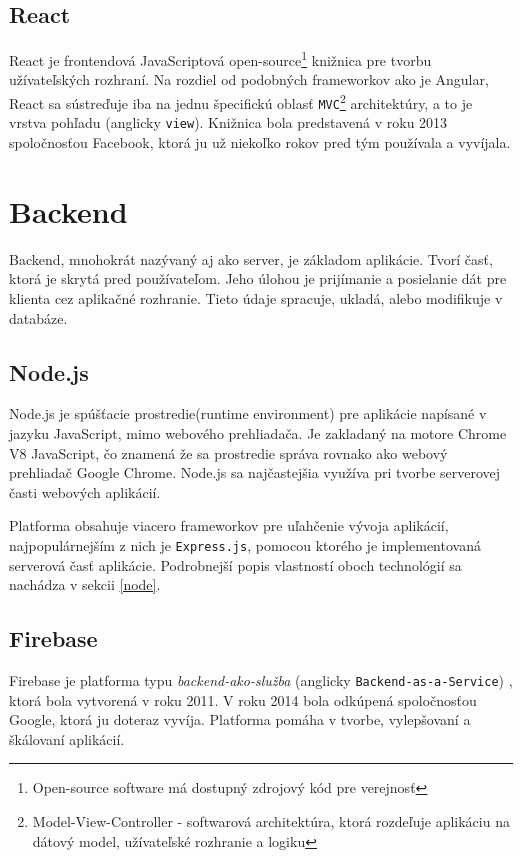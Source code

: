 \subsection{React}
React je frontendová JavaScriptová open-source\footnote{Open-source software má dostupný zdrojový kód pre verejnosť} knižnica pre tvorbu užívateľských rozhraní. Na rozdiel od podobných frameworkov ako je Angular, React\cite{react} sa sústreďuje iba na jednu špecifickú oblasť \texttt{MVC}\footnote{Model-View-Controller - softwarová architektúra, ktorá rozdeľuje aplikáciu na dátový model, užívateľské rozhranie a logiku} architektúry, a to je vrstva pohľadu (anglicky \texttt{view}). Knižnica bola predstavená v roku 2013 spoločnosťou Facebook, ktorá ju už niekoľko rokov pred tým používala a vyvíjala. 

\section{Backend}
Backend, mnohokrát nazývaný aj ako server, je základom aplikácie. Tvorí časť, ktorá je skrytá pred používateľom. Jeho úlohou je prijímanie a posielanie dát pre klienta cez aplikačné rozhranie. Tieto údaje spracuje, ukladá, alebo modifikuje v databáze.

\subsection{Node.js}
Node.js\cite{nodejs} je spúšťacie prostredie(runtime environment) pre aplikácie napísané v jazyku JavaScript, mimo webového prehliadača. Je zakladaný na motore Chrome V8 JavaScript, čo znamená že sa prostredie správa rovnako ako webový prehliadač Google Chrome. Node.js sa najčastejšia využíva pri tvorbe serverovej časti webových aplikácií.

Platforma obsahuje viacero frameworkov pre uľahčenie vývoja aplikácií, najpopulárnejším z nich je \texttt{Express.js}, pomocou ktorého je implementovaná serverová časť aplikácie. Podrobnejší popis vlastností oboch technológií sa nachádza v sekcii \ref{node}.

\subsection{Firebase}
Firebase\cite{firebase} je platforma typu \textit{backend-ako-služba} (anglicky \texttt{Backend-as-a-Service}) , ktorá bola vytvorená v roku 2011. V roku 2014 bola odkúpená spoločnosťou Google, ktorá ju doteraz vyvíja. Platforma pomáha v tvorbe, vylepšovaní a škálovaní aplikácií.

